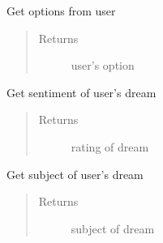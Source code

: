 \documentclass[letterpaper,10pt,english]{sphinxmanual}
\begin{document}
\begin{fulllineitems}
\begin{fulllineitems}
\label{\detokenize{index:Fralysis.Conversation.Conversation.get_post_analysis_option}}
Get options from user
\begin{quote}\begin{description}
\item[{Returns}] \leavevmode
user’s option

\end{description}\end{quote}

\end{fulllineitems}


\begin{fulllineitems}
\label{\detokenize{index:Fralysis.Conversation.Conversation.get_rating}}
Get sentiment of user’s dream
\begin{quote}\begin{description}
\item[{Returns}] \leavevmode
rating of dream

\end{description}\end{quote}

\end{fulllineitems}


\begin{fulllineitems}
\label{\detokenize{index:Fralysis.Conversation.Conversation.get_subject}}
Get subject of user’s dream
\begin{quote}\begin{description}
\item[{Returns}] \leavevmode
subject of dream

\end{description}\end{quote}

\end{fulllineitems}


\end{fulllineitems}
\end{document}
